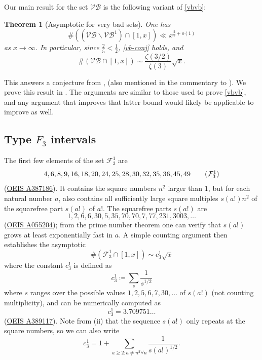 \documentclass[12pt]{amsart}
\newtheorem{theorem}{Theorem}[section]
\begin{document}
Our main result for the set $\mathcal{VB}$ is the following variant of \eqref{vbvb}:

\begin{theorem}[Asymptotic for very bad sets]\label{verybad-thm}  One has
$$   \#((\mathcal{VB} \backslash \mathcal{VB}^1) \cap [1,x]) \ll x^{\frac{2}{5}+o(1)}$$
as $x \to \infty$.  In particular, since $\frac{2}{5} < \frac{1}{2}$, \eqref{vb-conj} holds, and
$$ \#(\mathcal{VB} \cap [1,x]) \sim \frac{\zeta(3/2)}{\zeta(3)} \sqrt{x}.$$
\end{theorem}

This answers a conjecture from \cite[p. 345]{erdos-graham}, \cite[p. 73]{eg} (also mentioned in the commentary to \cite[Problem 380]{bloom}).  We prove this result in .  The arguments are similar to those used to prove \eqref{vbvb}, and any argument that improves that latter bound would likely be applicable to improve  as well.


\subsection{Type \texorpdfstring{$F_3$}{F3} intervals}

The first few elements of the set ${\mathcal F}_3^1$ are
\begin{equation}
 4, 6, 8, 9, 16, 18, 20, 24, 25, 28, 30, 32, 35, 36, 45, 49 \tag{${\mathcal F}_3^1$}
\end{equation}
(\href{https://oeis.org/A387186}{OEIS A387186}).
It contains the square numbers $n^2$ larger than $1$, but for each natural number $a$, also contains all sufficiently large square multiples $s(a!)n^2$ of the squarefree part $s(a!)$ of $a!$.  The squarefree parts $s(a!)$ are
\begin{equation}
    1, 2, 6, 6, 30, 5, 35, 70, 70, 7, 77, 231, 3003, \dots \tag{$s(a!)$}
\end{equation}
(\href{https://oeis.org/A055204}{OEIS A055204}); from the prime number theorem one can verify that $s(a!)$ grows at least exponentially fast in $a$. A simple counting argument then establishes the asymptotic
\begin{equation}\label{f31}
   \#({\mathcal F}_3^1 \cap [1,x]) \sim c_3^1 \sqrt{x}
\end{equation}
where the constant $c_3^1$ is defined as
$$ c_3^1 \coloneqq \sum_{s} \frac{1}{s^{1/2}}$$
where $s$ ranges over the possible values $1, 2, 5, 6, 7, 30, \dots$ of $s(a!)$ (not counting multiplicity), and can be numerically computed as
$$ c_3^1 = 3.709751\dots$$
(\href{https://oeis.org/A389117}{OEIS A389117}).  Note from (ii) that the sequence $s(a!)$ only repeats at the square numbers, so we can also write
$$ c_3^1 = 1 + \sum_{a \geq 2: a \neq n^2 \forall n} \frac{1}{s(a!)^{1/2}}.$$
\end{document}
